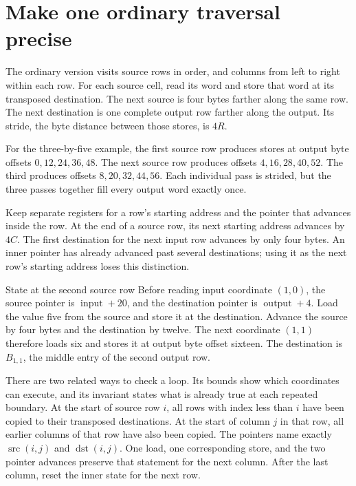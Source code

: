\section{Make one ordinary traversal precise}
The ordinary version visits source rows in order, and columns from left to right
within each row. For each source cell, read its word and store that word at its
transposed destination. The next source is four bytes farther along the same
row. The next destination is one complete output row farther along the output.
Its stride, the byte distance between those stores, is \(4R\).

For the three-by-five example, the first source row produces stores at output
byte offsets \(0,12,24,36,48\). The next source row produces offsets
\(4,16,28,40,52\). The third produces offsets \(8,20,32,44,56\).
Each individual pass is strided, but the three passes together fill every output
word exactly once.

Keep separate registers for a row's starting address and the pointer that advances
inside the row. At the end of a source row, its next starting address advances by
\(4C\). The first destination for the next input row advances by only four bytes.
An inner pointer has already advanced past several destinations; using it as the
next row's starting address loses this distinction.

\begin{MARSWorkedExample}{State at the second source row}
  Before reading input coordinate \((1,0)\), the source pointer is
  \(\operatorname{input}+20\), and the destination pointer is
  \(\operatorname{output}+4\). Load the value five from the source and store it at
  the destination. Advance the source by four bytes and the destination by twelve.
  The next coordinate \((1,1)\) therefore loads six and stores it at output byte
  offset sixteen. The destination is \(B_{1,1}\), the middle entry of the second
  output row.
\end{MARSWorkedExample}

There are two related ways to check a loop. Its bounds show which coordinates
can execute, and its invariant states what is already true at each repeated
boundary. At the start of source row \(i\), all rows with index less than \(i\)
have been copied to their transposed destinations. At the start of column \(j\)
in that row, all earlier columns of that row have also been copied. The pointers
name exactly \(\operatorname{src}(i,j)\) and \(\operatorname{dst}(i,j)\).
One load, one corresponding store, and the two pointer advances preserve that
statement for the next column. After the last column, reset the inner state for
the next row.

